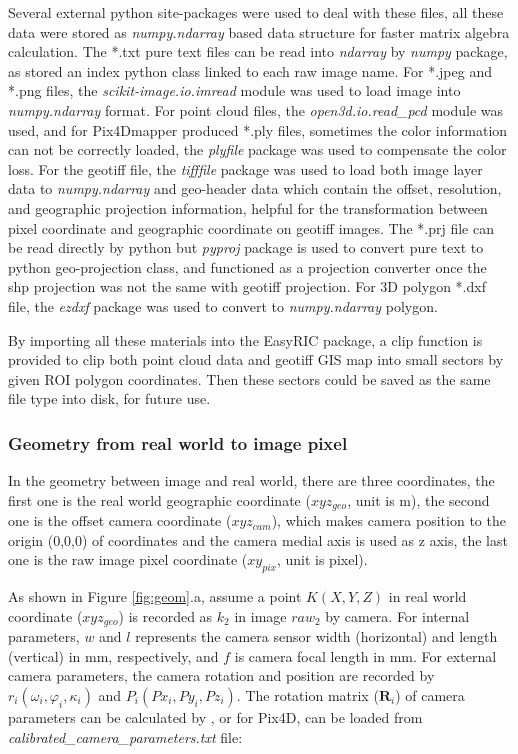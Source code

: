 \documentclass{configs/bmcart}
\begin{document}
Several external python site-packages were used to deal with these files, all these data were stored as \textit{numpy.ndarray} based data structure for faster matrix algebra calculation. The *.txt pure text files can be read into \textit{ndarray} by \textit{numpy} package, as stored an index python class linked to each raw image name. For *.jpeg and *.png files, the \textit{scikit-image.io.imread} module was used to load image into \textit{numpy.ndarray} format. For point cloud files, the \textit{open3d.io.read\_pcd} module was used, and for Pix4Dmapper produced *.ply files, sometimes the color information can not be correctly loaded, the \textit{plyfile} package was used to compensate the color loss. For the geotiff file, the \textit{tifffile} package was used to load both image layer data to \textit{numpy.ndarray} and geo-header data which contain the offset, resolution, and geographic projection information, helpful for the transformation between pixel coordinate and geographic coordinate on geotiff images. The *.prj file can be read directly by python but \textit{pyproj} package is used to convert pure text to python geo-projection class, and functioned as a projection converter once the shp projection was not the same with geotiff projection. For 3D polygon *.dxf file, the \textit{ezdxf} package was used to convert to \textit{numpy.ndarray} polygon.

By importing all these materials into the EasyRIC package, a clip function is provided to clip both point cloud data and geotiff GIS map into small sectors by given ROI polygon coordinates. Then these sectors could be saved as the same file type into disk, for future use.

\subsubsection*{Geometry from real world to image pixel}
In the geometry between image and real world, there are three coordinates, the first one is the real world geographic coordinate ($xyz_{geo}$, unit is m), the second one is the offset camera coordinate ($xyz_{cam}$), which makes camera position to the origin (0,0,0) of coordinates and the camera medial axis is used as z axis, the last one is the raw image pixel coordinate ($xy_{pix}$, unit is pixel). 

As shown in Figure \ref{fig:geom}.a, assume a point $K(X,Y,Z)$ in real world coordinate ($xyz_{geo}$) is recorded as $k_2$ in image $raw_2$ by camera. For internal parameters, $w$ and $l$ represents the camera sensor width (horizontal) and length (vertical) in mm, respectively, and $f$ is camera focal length in mm. For external camera parameters, the camera rotation and position are recorded by $r_i (\omega_i, \varphi_i, \kappa_i)$ \cite{pix4d_support_yaw_2020} and $P_i (Px_{i}, Py_{i}, Pz_{i})$. The rotation matrix ($\mathbf{R}_i$) of camera parameters 
can be calculated by \cite{pix4d_support_how_2020}, or for Pix4D, can be loaded from \textit{calibrated\_camera\_parameters.txt} file:
\end{document}

